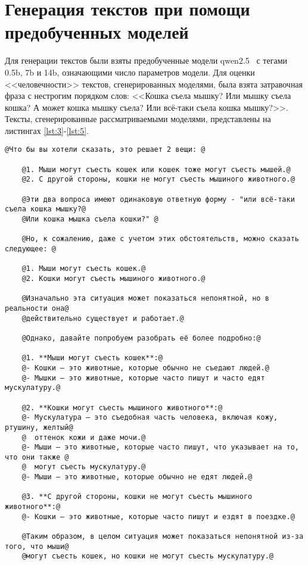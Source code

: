 \chapter{Генерация текстов при помощи предобученных моделей}

Для генерации текстов были взяты предобученные модели qwen2.5~\cite{qwen} с тегами 0.5b, 7b и 14b, означающими число параметров модели. Для оценки <<человечности>> текстов, сгенерированных моделями, была взята затравочная фраза с нестрогим порядком слов: <<Кошка съела мышку? Или мышку съела кошка? А может кошка мышку съела? Или всё-таки съела кошка мышку?>>. Тексты, сгенерированные рассматриваемыми моделями, представлены на листингах \ref{lst:3}-\ref{lst:5}.

\begin{lstlisting}[label=lst:3,caption=Текст\, сгенерированный моделью qwen2.5:0.5b]
	@Что бы вы хотели сказать, это решает 2 вещи: @

	@1. Мыши могут съесть кошек или кошек тоже могут съесть мышей.@
	@2. С другой стороны, кошки не могут съесть мышиного животного.@
	
	@Эти два вопроса имеют одинаковую ответную форму - "или всё-таки съела кошка мышку?@
	@Или кошка мышка съела кошки?" @
	
	@Но, к сожалению, даже с учетом этих обстоятельств, можно сказать следующее: @
	
	@1. Мыши могут съесть кошек.@
	@2. Кошки могут съесть мышиного животного.@
	
	@Изначально эта ситуация может показаться непонятной, но в реальности она@
	@действительно существует и работает.@
	
	@Однако, давайте попробуем разобрать её более подробно:@
	
	@1. **Мыши могут съесть кошек**:@
	@- Кошки — это животные, которые обычно не съедают людей.@
	@- Мышки — это животные, которые часто пишут и часто едят мускулатуру.@
	
	@2. **Кошки могут съесть мышиного животного**:@
	@- Мускулатура — это съедобная часть человека, включая кожу, ртушину, желтый@
	@  оттенок кожи и даже мочи.@
	@- Мыши — это животные, которые часто пишут, что указывает на то, что они также @
	@  могут съесть мускулатуру.@
	@- Мыши — это животные, которые обычно не едят людей.@
	
	@3. **С другой стороны, кошки не могут съесть мышиного животного**:@
	@- Кошки — это животные, которые часто пишут и ездят в поездке.@
	
	@Таким образом, в целом ситуация может показаться непонятной из-за того, что мыши@
	@могут съесть кошек, но кошки не могут съесть мускулатуру.@
\end{lstlisting}

